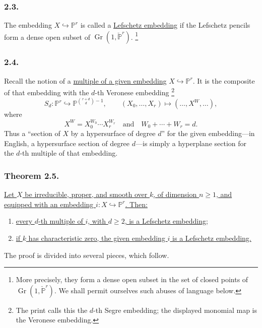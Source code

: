 \subsubsection*{2.3.}
The embedding $X\hookrightarrow\mathbb P^r$ is called a
\underline{Lefschetz embedding} if the Lefschetz pencils form a dense
open subset of $\operatorname{Gr}(1,\check{\mathbb P}^{r})$.
\footnote{More precisely, they form a dense open subset in the set of
closed points of $\operatorname{Gr}(1,\check{\mathbb P}^{r})$.  We
shall permit ourselves such abuses of language below.}

\subsubsection*{2.4.}
Recall the notion of a \underline{multiple of a given embedding}
$X\hookrightarrow\mathbb P^r$.  It is the composite of that embedding
with the $d$-th Veronese embedding
\footnote{The print calls this the $d$-th Segre embedding; the
displayed monomial map is the Veronese embedding.}
\[
S_d:\mathbb P^r\hookrightarrow
\mathbb P^{\binom{r+d}{d}-1},
\qquad
(X_0,\ldots,X_r)\longmapsto(\ldots,X^W,\ldots),
\]
where
\[
X^W=X_0^{W_0}\cdots X_r^{W_r}
\quad\text{and}\quad
W_0+\cdots+W_r=d.
\]
Thus a ``section of $X$ by a hypersurface of degree $d$'' for the
given embedding---in English, a hypersurface section of degree
$d$---is simply a hyperplane section for the $d$-th multiple of that
embedding.

\subsubsection*{Theorem 2.5.}
\underline{Let $X$ be irreducible, proper, and smooth over $k$, of
dimension $n\geq1$, and equipped with an embedding
$i:X\hookrightarrow\mathbb P^r$.  Then:}
\begin{enumerate}
\item[2.5.1.] \underline{every $d$-th multiple of $i$, with $d\geq2$,
is a Lefschetz embedding;}
\item[2.5.2.] \underline{if $k$ has characteristic zero, the given
embedding $i$ is a Lefschetz embedding.}
\end{enumerate}
The proof is divided into several pieces, which follow.
